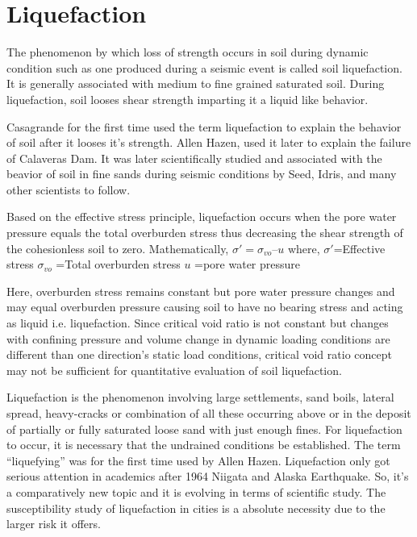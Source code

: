 \section{Liquefaction}
  The phenomenon by which loss of strength occurs in soil during dynamic condition such as one produced during a seismic event is called soil liquefaction. It is generally associated with medium to fine grained saturated soil. During liquefaction, soil looses shear strength imparting it a liquid like behavior.

Casagrande\cite{arthur_characteristics_1936} for the first time used the term liquefaction to explain the behavior of soil after it looses it's strength. Allen Hazen,\cite{hazen_study_1918} used it later to explain the failure of Calaveras Dam. It was later scientifically studied and associated with the beavior of soil in fine sands during seismic conditions by Seed, Idris,\cite{r11} and many other scientists to follow. 

Based on the effective stress principle, liquefaction occurs when the pore water pressure  equals the total overburden stress thus decreasing the shear strength of the cohesionless soil to zero. Mathematically,
	$\sigma'  =  \sigma_{vo} – u$
where,
	$\sigma'$=Effective stress
	$\sigma_{vo}$ =Total overburden stress
	$u$ =pore water pressure

Here, overburden stress remains constant but pore water pressure changes and may equal overburden pressure causing soil to have no bearing stress and acting as liquid i.e. liquefaction. Since critical void ratio is not constant but changes with confining pressure and volume change in dynamic loading conditions are different than one  direction's static load conditions, critical void ratio concept may not be sufficient for quantitative evaluation of soil liquefaction.

Liquefaction is the phenomenon involving large settlements, sand boils, lateral spread, heavy-cracks or combination of all these occurring above or in the deposit of partially or fully saturated loose sand with just enough fines. For liquefaction to occur, it is necessary that the undrained conditions be established. The term “liquefying” was for the first time used by Allen Hazen\cite{hazen_study_1918}. Liquefaction only got serious attention in academics after 1964 Niigata and Alaska Earthquake. So, it’s a comparatively new topic and it is evolving in terms of scientific study. The susceptibility study of liquefaction in cities is a absolute necessity due to the larger risk it offers.
 
